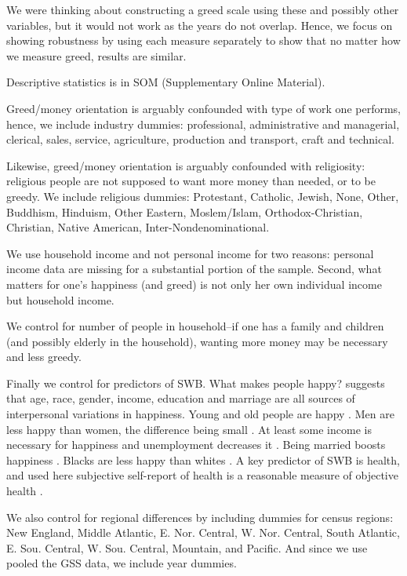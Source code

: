 \documentclass[10pt, letterpaper]{article}
\begin{document}
\begin{spacing}{1.8}
We were thinking about constructing a greed scale using these and possibly other
variables, but it would not work as the years do not overlap. Hence, we focus on
showing robustness by using each measure separately to show that no matter how
we measure greed, results are similar. 

Descriptive statistics is in SOM (Supplementary Online Material).

Greed/money orientation is arguably confounded with type of work one performs,
hence, we include industry dummies: professional, administrative and managerial, clerical, sales, service, agriculture, production and transport, craft and technical.           

Likewise, greed/money orientation is arguably confounded with religiosity:
religious people are not supposed to want more money than needed, or to be greedy. We include religious dummies: Protestant, Catholic, Jewish, None, Other, Buddhism, Hinduism, Other Eastern, Moslem/Islam, Orthodox-Christian, Christian, Native American, Inter-Nondenominational.

We use household income and not personal income for two reasons: personal income
data are missing for a substantial portion of the sample. 
Second, what matters for one's happiness (and greed) is not only her own individual
income but household income.

We control for number of people in household--if one has a family and children
(and possibly elderly in the household), wanting more money may be necessary and
less greedy.

Finally we control for predictors of SWB. What makes people happy?
\citet{myers00} suggests that age, race, gender, income, education and marriage
are all sources of interpersonal variations in happiness. Young and old people
are happy  \citep[e.g.,][]{teksoz}. Men are less happy than women, the
difference being small \citep{blanchflower04o}. At least some income is necessary for  happiness and unemployment decreases it
    \citep[e.g.,][]{ditella01moa,ditella01mob,ditella06m}. Being married boosts happiness \citep[e.g.,][]{myers00,diener04s}.
     Blacks are less happy than whites
    \citep[e.g.,][]{aokcities,aok11a,blanchflower04o}.   
     A key predictor of SWB is health, and used here subjective self-report of
     health is a reasonable measure of objective health \citep{subramanian09b}.


We also control for regional  differences by including dummies for census regions:
 New England, Middle Atlantic, E. Nor. Central, W. Nor. Central, South
Atlantic, E. Sou. Central, W. Sou. Central, Mountain, and Pacific. And since we
use pooled the GSS data, we include year dummies.


\end{spacing}
\end{document}
